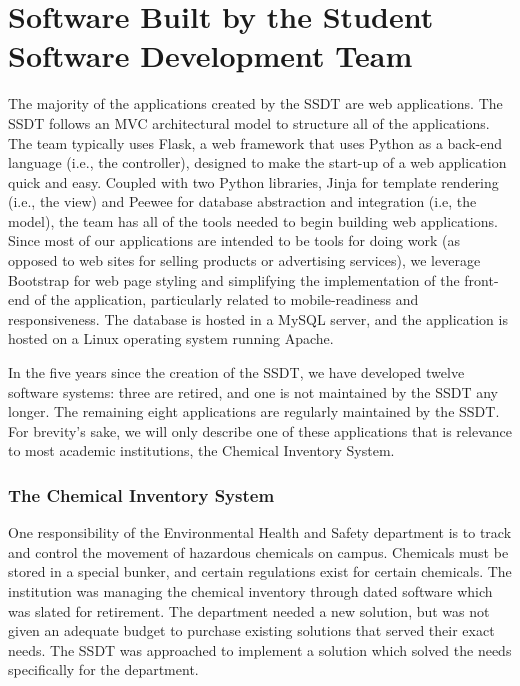 \section{Software Built by the Student Software Development Team}
The majority of the applications created by the SSDT are web applications. The SSDT follows an MVC architectural model to structure all of the applications. The team typically uses Flask, a web framework that uses Python as a back-end language (i.e., the controller), designed to make the start-up of a web application quick and easy. Coupled with two Python libraries, Jinja for template rendering (i.e., the view) and Peewee for database abstraction and integration (i.e, the model), the team has all of the tools needed to begin building web applications. Since most of our applications are intended to be tools for doing work (as opposed to web sites for selling products or advertising services), we leverage Bootstrap for web page styling and simplifying the implementation of the front-end of the application, particularly related to mobile-readiness and responsiveness. The database is hosted in a MySQL server, and the application is hosted on a Linux operating system running Apache. 

In the five years since the creation of the SSDT, we have developed twelve software systems: three are retired, and one is not maintained by the SSDT any longer. The remaining eight applications are regularly maintained by the SSDT. For brevity's sake, we will only describe one of these applications that is relevance to most academic institutions, the Chemical Inventory System.



\subsubsection{The Chemical Inventory System} %
One responsibility of the Environmental Health and Safety department is to track and control the movement of hazardous chemicals on campus. Chemicals must be stored in a special bunker, and certain regulations exist for certain chemicals. The institution was managing the chemical inventory through dated software which was slated for retirement. The department needed a new solution, but was not given an adequate budget to purchase existing solutions that served their exact needs. The SSDT was approached to implement a solution which solved the needs specifically for the department. 

